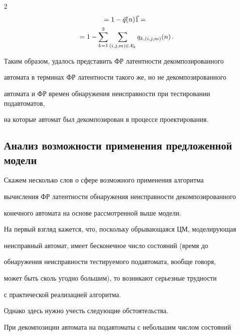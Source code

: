 \begin{multicols}{2}
\begin{multline*}
=


1 - \v q(n) \v1 ={}\\


{}=


1 - \sum\limits_{k=1}^3 \sum\limits_{(i,j,m)\in {\cal X}_k} q_{k,(i,j,m)}(n)\,.


\end{multline*}





Таким образом, удалось представить ФР латентности декомпозированного


автомата в терминах ФР латентности такого же, но не декомпозированного


автомата и ФР времен обнаружения не\-ис\-прав\-ности при тестировании подавтоматов,


на которые автомат был декомпозирован в процессе проектирования.







\subsection{Анализ возможности применения предложенной модели}





Скажем несколько слов о сфере возможного применения алгоритма


вычисления ФР ла\-тент\-ности обнаружения неисправности декомпозированного


конечного автомата на основе рассмотренной выше модели.





На первый взгляд кажется, что, поскольку обрывающаяся ЦМ, моделирующая


неисправный автомат, имеет бесконечное число состояний (время до


обнаружения неисправности тес\-ти\-ру\-емо\-го под\-ав\-то\-ма\-та, вообще говоря,


может быть сколь угодно большим), то возникают серьезные трудности


с практической реализацией алгоритма.


Однако здесь нужно учесть следующие обстоятельства.





При декомпозиции автомата на подавтоматы с небольшим числом состояний



\end{multicols}
